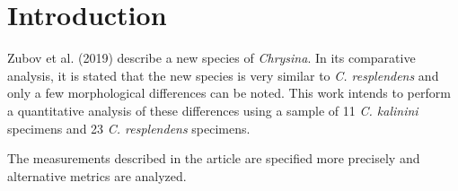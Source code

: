 \section{Introduction}

Zubov et al. (2019) describe a new species of \textit{Chrysina}. In its comparative analysis, it is stated that the new species is very similar to \textit{C. resplendens} and only a few morphological differences can be noted. This work intends to perform a quantitative analysis of these differences using a sample of 11 \textit{C. kalinini} specimens and 23 \textit{C. resplendens} specimens.

The measurements described in the article are specified more precisely and alternative metrics are analyzed.

\newpage
